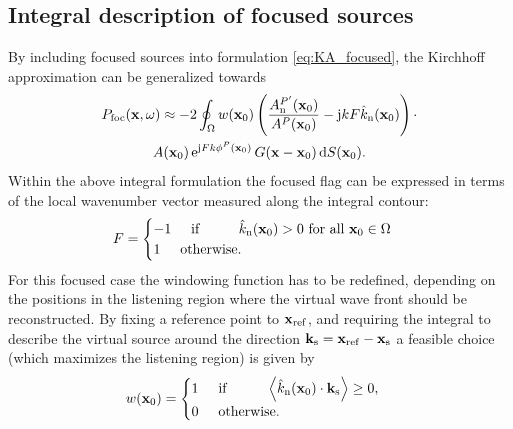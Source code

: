 \documentclass[lettersize,journal]{IEEEtran}
\begin{document}
\subsection{Integral description of focused sources}
By including focused sources into formulation \eqref{eq:KA_focused}, the Kirchhoff approximation can be generalized towards
\begin{multline}
  P_{\mathrm{foc}}(\mathbf{x},\omega) \approx  -2 \oint_\Omega w(\mathbf{x}_0) \left( \frac{A^{P'}_{\mathrm{n}}(\mathbf{x}_0)}{A^P(\mathbf{x}_0)} - \mathrm{j} k F \hat{k}_\mathrm{n}(\mathbf{x}_0) \right) \cdot \\ 
  A(\mathbf{x}_0)\, \mathrm{e}^{ \mathrm{j} F k \phi^P(\mathbf{x}_0)} \, G(\mathbf{x}-\mathbf{x}_0) \,\mathrm{d} S(\mathbf{x}_0).
  \label{eq:KA_focused}
\end{multline}
Within the above integral formulation the focused flag can be expressed in terms of the local wavenumber vector measured along the integral contour:
\begin{equation}
  F = 
  \begin{cases}
    -1  \hspace{5mm} \text{if} \hspace{1cm} \hat{k}_\mathrm{n}(\mathbf{x}_0) > 0 \text{ for all } \mathbf{x}_0 \in \Omega \\
    1   \hspace{5mm} \text{otherwise}.
  \end{cases}
\end{equation}
For this focused case the windowing function has to be redefined, depending on the positions in the listening region where the virtual wave front should be reconstructed.
By fixing a reference point to $\mathbf{x}_{\mathrm{ref}}$, and requiring the integral to describe the virtual source around the direction $\mathbf{k}_{\mathrm{s}} = \mathbf{x}_{\mathrm{ref}}-\mathbf{x}_{\mathrm{s}}$ a feasible choice (which maximizes the listening region) is given by
\begin{equation}
  w(\mathbf{x}_0) = 
  \begin{cases}
    1  \hspace{5mm} \text{if} \hspace{1cm} \left< \hat{k}_\mathrm{n}(\mathbf{x}_0) \cdot \mathbf{k}_{\mathrm{s}} \right> \geq 0, \\
    0   \hspace{5mm} \text{otherwise}.
  \end{cases}
\end{equation}
\end{document}
